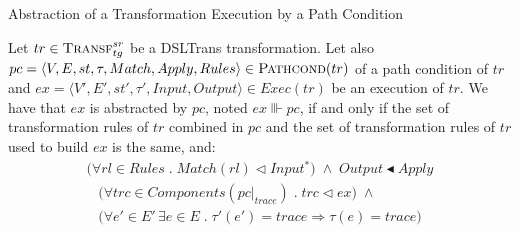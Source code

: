 \begin{definition}{Abstraction of a Transformation Execution by a Path Condition\\}
\label{def:abstraction_pc_ex}

Let $tr\in \textsc{Transf}^{sr}_{tg}$ be a DSLTrans transformation. Let also $pc = \langle V,E,st,\tau,Match,Apply,Rules\rangle \in
\textsc{Pathcond}(tr)$ of a path condition of $tr$ and $ex = \langle V',E',st',\tau',Input,Output\rangle \in Exec(tr)$ be an execution of $tr$. We have that $ex$ is abstracted by $pc$, noted $ex\Vvdash pc$, if and only if the set of transformation rules of $tr$ combined in $pc$ and the set of transformation rules of $tr$ used to build $ex$ is the same, and:
\begin{multline}
\label{eq:abstr_input_output}
\big(\forall rl\in Rules\;.\;Match(rl) \vartriangleleft Input^*\big) \;\land\; Output \blacktriangleleft Apply
\end{multline}
\begin{multline}
\label{eq:abstr_trace}
\big(\forall trc\in Components(pc|_{trace})\;.\;trc\vartriangleleft ex\big)\;\land\;\\
\big(\forall e'\in E'\, \exists e\in E\;.\;\tau'(e')=trace \Longrightarrow \tau(e)=trace\big)
\end{multline} 

\end{definition} 



